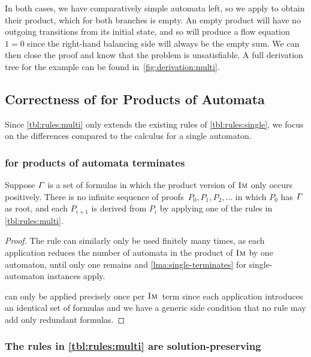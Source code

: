 In both cases, we have comparatively simple automata left, so we apply
\Materialise{} to obtain their product, which for both branches is empty. An
empty product will have no outgoing transitions from its initial state, and so
will produce a flow equation $1 = 0$ since the right-hand balancing side will
always be the empty sum. We can then close the proof and know that the problem
is unsatisfiable. A full derivation tree for the example can be found 
in~\cref{fig:derivation:multi}.


\subsection{Correctness of \Calculus{} for Products of Automata}

Since \cref{tbl:rules:multi} only extends the existing rules of
\cref{tbl:rules:single}, we focus on the differences compared
to the calculus for a single automaton.

\subsubsection{\Calculus{} for products of automata terminates}
\begin{lemma}\label{lma:multi-terminates}
  Suppose $\varGamma{}$ is a set of formulas in which the product
  version of $\operatorname{\textsc{Im}}$ only occurs positively. There is no
  infinite sequence of proofs~$P_0, P_1, P_2, \ldots$ in which $P_0$
  has $\varGamma{}$ as root, and each $P_{i+1}$ is derived from
  $P_i$ by applying one of the rules in \cref{tbl:rules:multi}.
\end{lemma}

\begin{proof}
  The rule \Materialise{} can similarly only be used finitely many times, as
  each application reduces the number of automata in the product of $\operatorname{\textsc{Im}}$ by
  one automaton, until only one remains and \cref{lma:single-terminates} for
  single-automaton instances apply.
  
  \ExpandM{} can only be applied precisely once per $\operatorname{\textsc{Im}}$~term since
  each application introduces an identical set of formulas and we have a generic
  side condition that no rule may add only redundant formulas.
\end{proof}

\subsubsection{The rules in \cref{tbl:rules:multi} are solution-preserving}

